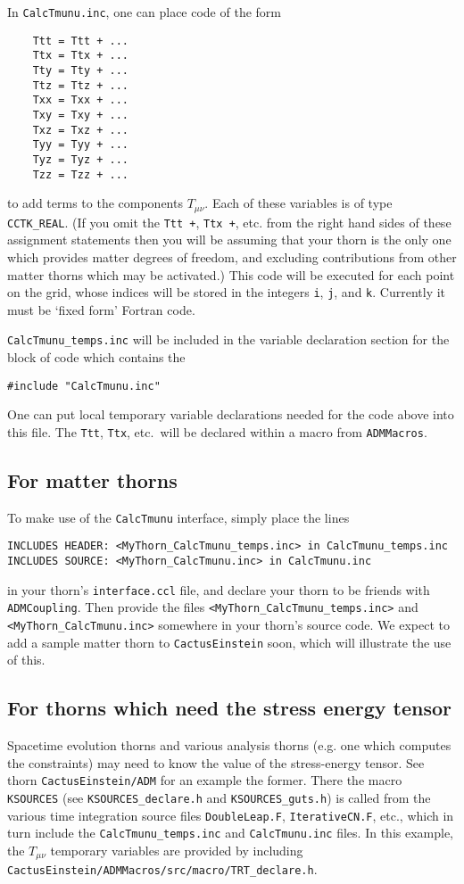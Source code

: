 \documentclass{article}
\begin{document}
In \texttt{CalcTmunu.inc}, one can place code of the form
\begin{verbatim}
	Ttt = Ttt + ...
	Ttx = Ttx + ...
	Tty = Tty + ...
	Ttz = Ttz + ...
	Txx = Txx + ...
	Txy = Txy + ...
	Txz = Txz + ...
	Tyy = Tyy + ...
	Tyz = Tyz + ...
	Tzz = Tzz + ...
\end{verbatim}
to add terms to the components $T_{\mu\nu}$.  Each of these variables
is of type \texttt{CCTK\_REAL}.  (If you omit the
\texttt{Ttt \nolinebreak+}, \texttt{Ttx \nolinebreak+}, etc. from the right hand sides of
these assignment statements then you will be assuming that your thorn
is the only one which provides matter degrees of freedom, and
excluding contributions from other matter thorns which may be
activated.)
This code will be
executed for each point on the grid, whose indices will be stored in
the integers \texttt{i}, \texttt{j}, and \texttt{k}.  Currently it must be 
`fixed form' Fortran code.

\texttt{CalcTmunu\_temps.inc} will be
included in the variable declaration section for the block of code
which contains the
\nopagebreak
\begin{verbatim}
#include "CalcTmunu.inc"
\end{verbatim}
One can put local temporary variable declarations needed for the code
above into this file.  The \texttt{Ttt}, \texttt{Ttx}, etc.~will be
declared within a macro from \texttt{ADMMacros}.

\subsection{For matter thorns}
To make use of the {\tt CalcTmunu} interface, simply place the lines
\begin{verbatim}
INCLUDES HEADER: <MyThorn_CalcTmunu_temps.inc> in CalcTmunu_temps.inc
INCLUDES SOURCE: <MyThorn_CalcTmunu.inc> in CalcTmunu.inc
\end{verbatim}
in your thorn's \texttt{interface.ccl} file, and declare your thorn to
be friends with \texttt{ADMCoupling}.  Then provide the files
\texttt{<MyThorn\_CalcTmunu\_temps.inc>} and
\texttt{<MyThorn\_CalcTmunu.inc>} somewhere in your thorn's source
code.
We expect to add a sample matter thorn to \texttt{CactusEinstein}
soon, which will illustrate the use of this.

\subsection{For thorns which need the stress energy tensor}
Spacetime evolution thorns and various analysis thorns (e.g. one which
computes the constraints) may need to
know the value of the stress-energy tensor.
See thorn \texttt{CactusEinstein/ADM} for an example the former.
There the macro \texttt{KSOURCES} (see \texttt{KSOURCES\_declare.h}
and \texttt{KSOURCES\_guts.h}) is called from the various time
integration source files \texttt{DoubleLeap.F},
\texttt{IterativeCN.F}, etc., which in turn include the
\texttt{CalcTmunu\_temps.inc} and \texttt{CalcTmunu.inc} files.  In
this example, the
$T_{\mu\nu}$ temporary variables are provided by including
\texttt{CactusEinstein/ADMMacros/src/macro/TRT\_declare.h}.
\end{document}
